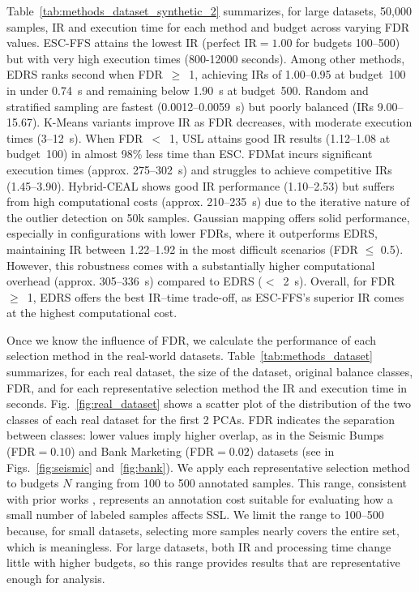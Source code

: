 \documentclass[preprint,12pt]{elsarticle}
\begin{document}
Table~\ref{tab:methods_dataset_synthetic_2} summarizes, for large datasets, 50,000 samples,  IR and execution time for each method and budget across varying FDR values. ESC-FFS attains the lowest IR (perfect IR$=1.00$ for budgets 100–500) but with very high execution times (800-12000 seconds). Among other methods, EDRS ranks second when FDR~$\geq$~1, achieving IRs of 1.00–0.95 at budget~100 in under 0.74~s and remaining below 1.90~s at budget~500. Random and stratified sampling are fastest (0.0012–0.0059~s) but poorly balanced (IRs 9.00–15.67). K-Means variants improve IR as FDR decreases, with moderate execution times (3–12~s). When FDR~$<$~1, USL attains good IR results (1.12–1.08 at budget~100) in almost 98\% less time than ESC. FDMat incurs significant execution times (approx. 275–302~s) and struggles to achieve competitive IRs (1.45–3.90). Hybrid-CEAL shows good IR performance (1.10–2.53) but suffers from high computational costs (approx. 210–235~s) due to the iterative nature of the outlier detection on 50k samples. Gaussian mapping offers solid performance, especially in configurations with lower FDRs, where it outperforms EDRS, maintaining IR between 1.22--1.92 in the most difficult scenarios (FDR $\le$ 0.5). However, this robustness comes with a substantially higher computational overhead (approx. 305–336~s) compared to EDRS ($<$~2~s). Overall, for FDR~$\geq$~1, EDRS offers the best IR–time trade-off, as ESC-FFS’s superior IR comes at the highest computational cost.

Once we know the influence of FDR, we calculate the performance of each selection method in the real-world datasets. Table~\ref{tab:methods_dataset} summarizes, for each real dataset, the size of the dataset, original balance classes, FDR, and for each representative selection method the IR and execution time in seconds. Fig.~\ref{fig:real_dataset} shows a scatter plot of the distribution of the two classes of each real dataset for the first 2 PCAs. FDR indicates the separation between classes: lower values imply higher overlap, as in the Seismic Bumps (FDR$=0.10$) and Bank Marketing (FDR$=0.02$) datasets (see in Figs.~\ref{fig:seismic} and~\ref{fig:bank}). We apply each representative selection method to budgets $N$ ranging from 100 to 500 annotated samples. This range, consistent with prior works \cite{wang2022unsupervised,roy2024impact}, represents an annotation cost suitable for evaluating how a small number of labeled samples affects SSL. We limit the range to 100–500 because, for small datasets, selecting more samples nearly covers the entire set, which is meaningless. For large datasets, both IR and processing time change little with higher budgets, so this range provides results that are representative enough for analysis. 
\end{document}
